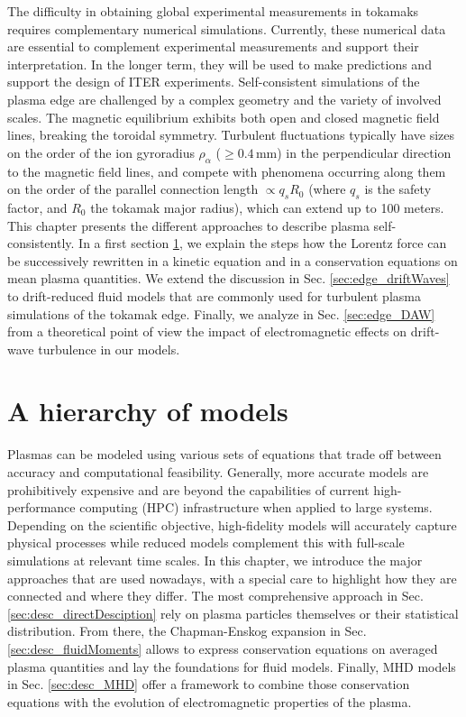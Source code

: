 The difficulty in obtaining global experimental measurements in tokamaks requires complementary numerical simulations. Currently, these numerical data are essential to complement experimental measurements and support their interpretation. In the longer term, they will be used to make predictions and support the design of ITER experiments. Self-consistent simulations of the plasma edge are challenged by a complex geometry and the variety of involved scales. The magnetic equilibrium exhibits both open and closed magnetic field lines, breaking the toroidal symmetry. Turbulent fluctuations typically have sizes on the order of the ion gyroradius $\rho_\alpha$ ($\ge 0.4\, \text{mm}$)\cite{hennequin2004} in the perpendicular direction to the magnetic field lines, and compete with phenomena occurring along them on the order of the parallel connection length $\propto q_s R_0$ (where $q_s$ is the safety factor, and $R_0$ the tokamak major radius), which can extend up to 100 meters. \\

This chapter presents the different approaches to describe plasma self-consistently. In a first section \ref{sec:desc_modelHierarchy}, we explain the steps how the Lorentz force can be successively rewritten in a kinetic equation and in a conservation equations on mean plasma quantities. We extend the discussion in Sec. \ref{sec:edge_driftWaves} to drift-reduced fluid models that are commonly used for turbulent plasma simulations of the tokamak edge. Finally, we analyze in Sec. \ref{sec:edge_DAW} from a theoretical point of view the impact of electromagnetic effects on drift-wave turbulence in our models. 


\section{A hierarchy of models}
\label{sec:desc_modelHierarchy}

Plasmas can be modeled using various sets of equations that trade off between accuracy and computational feasibility. Generally, more accurate models are prohibitively expensive and are beyond the capabilities of current high-performance computing (HPC) infrastructure when applied to large systems. Depending on the scientific objective, high-fidelity models will accurately capture physical processes while reduced models complement this with full-scale simulations at relevant time scales. In this chapter, we introduce the major approaches that are used nowadays, with a special care to highlight how they are connected and where they differ. The most comprehensive approach in Sec. \ref{sec:desc_directDesciption} rely on plasma particles themselves or their statistical distribution. From there, the Chapman-Enskog expansion in Sec. \ref{sec:desc_fluidMoments} allows to express conservation equations on averaged plasma quantities and lay the foundations for fluid models. Finally, MHD models in Sec. \ref{sec:desc_MHD} offer a framework to combine those conservation equations with the evolution of electromagnetic properties of the plasma. 

